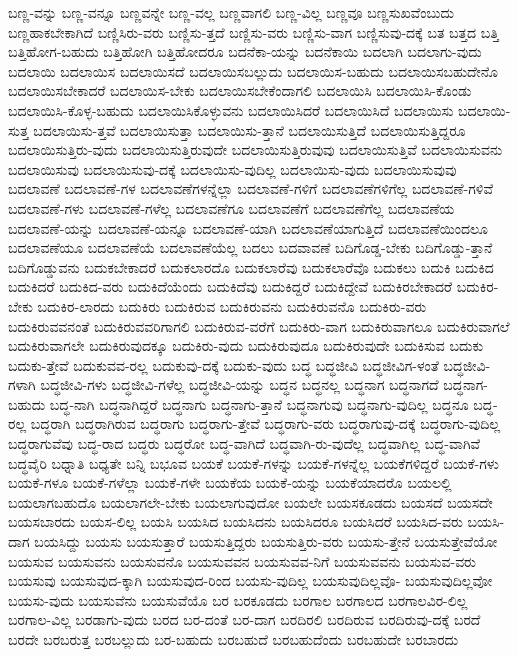 {ಬಣ್ಣ-ವನ್ನು
ಬಣ್ಣ-ವನ್ನೂ
ಬಣ್ಣವನ್ನೇ
ಬಣ್ಣ-ವಲ್ಲ
ಬಣ್ಣವಾಗಲಿ
ಬಣ್ಣ-ವಿಲ್ಲ
ಬಣ್ಣವೂ
ಬಣ್ಣಸುಖವೆಂಬುದು
ಬಣ್ಣಹಾಕಬೇಕಾಗಿದೆ
ಬಣ್ಣಿಸಿರು-ವರು
ಬಣ್ಣಿಸು-ತ್ತದೆ
ಬಣ್ಣಿಸು-ವರು
ಬಣ್ಣಿಸು-ವಾಗ
ಬಣ್ಣಿಸುವು-ದಕ್ಕೆ
ಬತ
ಬತ್ತದ
ಬತ್ತಿ
ಬತ್ತಿಹೋಗ-ಬಹುದು
ಬತ್ತಿಹೋಗಿ
ಬತ್ತಿಹೋದರೂ
ಬದನೆಕಾ-ಯನ್ನು
ಬದನೆಕಾಯಿ
ಬದಲಾಗಿ
ಬದಲಾಗು-ವುದು
ಬದಲಾಯಿ
ಬದಲಾಯಿಸ
ಬದಲಾಯಿಸದೆ
ಬದಲಾಯಿಸಬಲ್ಲುದು
ಬದಲಾಯಿಸ-ಬಹುದು
ಬದಲಾಯಿಸಬಹುದೇನೊ
ಬದಲಾಯಿಸಬೇಕಾದರೆ
ಬದಲಾಯಿಸ-ಬೇಕು
ಬದಲಾಯಿಸಬೇಕೆಂದಾಗಲಿ
ಬದಲಾಯಿಸಿ
ಬದಲಾಯಿಸಿ-ಕೊಂಡು
ಬದಲಾಯಿಸಿ-ಕೊಳ್ಳ-ಬಹುದು
ಬದಲಾಯಿಸಿಕೊಳ್ಳುವನು
ಬದಲಾಯಿಸಿದರೆ
ಬದಲಾಯಿಸಿದೆ
ಬದಲಾಯಿಸು
ಬದಲಾಯಿ-ಸುತ್ತ
ಬದಲಾಯಿಸು-ತ್ತವೆ
ಬದಲಾಯಿಸುತ್ತಾ
ಬದಲಾಯಿಸು-ತ್ತಾನೆ
ಬದಲಾಯಿಸುತ್ತಿದೆ
ಬದಲಾಯಿಸುತ್ತಿದ್ದರೂ
ಬದಲಾಯಿಸುತ್ತಿರು-ವುದು
ಬದಲಾಯಿಸುತ್ತಿರುವುದೇ
ಬದಲಾಯಿಸುತ್ತಿರುವುವು
ಬದಲಾಯಿಸುತ್ತಿವೆ
ಬದಲಾಯಿಸುವನು
ಬದಲಾಯಿಸುವು
ಬದಲಾಯಿಸುವು-ದಕ್ಕೆ
ಬದಲಾಯಿಸು-ವುದಿಲ್ಲ
ಬದಲಾಯಿಸು-ವುದು
ಬದಲಾಯಿಸುವುವು
ಬದಲಾವಣೆ
ಬದಲಾವಣೆ-ಗಳ
ಬದಲಾವಣೆಗಳನ್ನೆಲ್ಲಾ
ಬದಲಾವಣೆ-ಗಳಿಗೆ
ಬದಲಾವಣೆಗಳಿಗೆಲ್ಲ
ಬದಲಾವಣೆ-ಗಳಿವೆ
ಬದಲಾವಣೆ-ಗಳು
ಬದಲಾವಣೆ-ಗಳೆಲ್ಲ
ಬದಲಾವಣೆಗೂ
ಬದಲಾವಣೆಗೆ
ಬದಲಾವಣೆಗೆಲ್ಲ
ಬದಲಾವಣೆಯ
ಬದಲಾವಣೆ-ಯನ್ನು
ಬದಲಾವಣೆ-ಯನ್ನೂ
ಬದಲಾವಣೆ-ಯಾಗಿ
ಬದಲಾವಣೆಯಾಗುತ್ತಿದೆ
ಬದಲಾವಣೆಯಿಂದಲೂ
ಬದಲಾವಣೆಯೂ
ಬದಲಾವಣೆಯೆ
ಬದಲಾವಣೆಯೆಲ್ಲ
ಬದಲು
ಬದವಾವಣೆ
ಬದಿಗೊಡ್ಡ-ಬೇಕು
ಬದಿಗೊಡ್ಡು-ತ್ತಾನೆ
ಬದಿಗೊಡ್ಡುವನು
ಬದುಕಬೇಕಾದರೆ
ಬದುಕಲಾರದೊ
ಬದುಕಲಾರೆವು
ಬದುಕಲಾರೆವೊ
ಬದುಕಲು
ಬದುಕಿ
ಬದುಕಿದ
ಬದುಕಿದರೆ
ಬದುಕಿದ-ವರು
ಬದುಕಿದೆಯೆಂದು
ಬದುಕಿದೆವು
ಬದುಕಿದ್ದರೆ
ಬದುಕಿದ್ದೇವೆ
ಬದುಕಿರಬೇಕಾದರೆ
ಬದುಕಿರ-ಬೇಕು
ಬದುಕಿರ-ಲಾರದು
ಬದುಕಿರು
ಬದುಕಿರುವ
ಬದುಕಿರುವನು
ಬದುಕಿರುವನೊ
ಬದುಕಿರು-ವರು
ಬದುಕಿರುವವನಂತೆ
ಬದುಕಿರುವವರಿಗಾಗಲಿ
ಬದುಕಿರುವ-ವರೆಗೆ
ಬದುಕಿರು-ವಾಗ
ಬದುಕಿರುವಾಗಲೂ
ಬದುಕಿರುವಾಗಲೆ
ಬದುಕಿರುವಾಗಲೇ
ಬದುಕಿರುವುದಕ್ಕೂ
ಬದುಕಿರು-ವುದು
ಬದುಕಿರುವುದೂ
ಬದುಕಿರುವುದೇ
ಬದುಕಿಸುವ
ಬದುಕು
ಬದುಕು-ತ್ತೇವೆ
ಬದುಕುವವ-ರಲ್ಲ
ಬದುಕುವು-ದಕ್ಕೆ
ಬದುಕು-ವುದು
ಬದ್ಧ
ಬದ್ಧಜೀವಿ
ಬದ್ಧಜೀವಿಗ-ಳಂತೆ
ಬದ್ಧಜೀವಿ-ಗಳಾಗಿ
ಬದ್ಧಜೀವಿ-ಗಳು
ಬದ್ಧಜೀವಿ-ಗಳೆಲ್ಲ
ಬದ್ಧಜೀವಿ-ಯನ್ನು
ಬದ್ಧನ
ಬದ್ಧನಲ್ಲ
ಬದ್ಧನಾಗ
ಬದ್ಧನಾಗದೆ
ಬದ್ಧನಾಗ-ಬಹುದು
ಬದ್ಧ-ನಾಗಿ
ಬದ್ಧನಾಗಿದ್ದರೆ
ಬದ್ಧನಾಗು
ಬದ್ಧನಾಗು-ತ್ತಾನೆ
ಬದ್ಧನಾಗುವು
ಬದ್ಧನಾಗು-ವುದಿಲ್ಲ
ಬದ್ಧನೂ
ಬದ್ಧ-ರಲ್ಲ
ಬದ್ಧರಾಗಿ
ಬದ್ಧರಾಗಿರುವ
ಬದ್ಧರಾಗು
ಬದ್ಧರಾಗು-ತ್ತೇವೆ
ಬದ್ಧರಾಗು-ವರು
ಬದ್ಧರಾಗುವು-ದಕ್ಕೆ
ಬದ್ಧರಾಗು-ವುದಿಲ್ಲ
ಬದ್ಧರಾಗುವೆವು
ಬದ್ಧ-ರಾದ
ಬದ್ಧರು
ಬದ್ಧರೋ
ಬದ್ಧ-ವಾಗಿದೆ
ಬದ್ಧವಾಗಿ-ರು-ವುದೆಲ್ಲ
ಬದ್ಧವಾಗಿಲ್ಲ
ಬದ್ಧ-ವಾಗಿವೆ
ಬದ್ಧವೈರಿ
ಬಧ್ನಾತಿ
ಬಧ್ಯತೇ
ಬನ್ನಿ
ಬಭೂವ
ಬಯಕೆ
ಬಯಕೆ-ಗಳನ್ನು
ಬಯಕೆ-ಗಳನ್ನೆಲ್ಲ
ಬಯಕೆಗಳಿದ್ದರೆ
ಬಯಕೆ-ಗಳು
ಬಯಕೆ-ಗಳೂ
ಬಯಕೆ-ಗಳೆಲ್ಲಾ
ಬಯಕೆ-ಗಳೇ
ಬಯಕೆಯ
ಬಯಕೆ-ಯನ್ನು
ಬಯಕೆಯಾದರೊ
ಬಯಲಲ್ಲಿ
ಬಯಲಾಗಬಹುದೊ
ಬಯಲಾಗಲೇ-ಬೇಕು
ಬಯಲಾಗುವುದೋ
ಬಯಲೇ
ಬಯಸಕೂಡದು
ಬಯಸದೆ
ಬಯಸದೇ
ಬಯಸಬಾರದು
ಬಯಸ-ಲಿಲ್ಲ
ಬಯಸಿ
ಬಯಸಿದ
ಬಯಸಿದನು
ಬಯಸಿದರೂ
ಬಯಸಿದರೆ
ಬಯಸಿದ-ವರು
ಬಯಸಿ-ದಾಗ
ಬಯಸಿದ್ದು
ಬಯಸು
ಬಯಸುತ್ತಾರೆ
ಬಯಸುತ್ತಿದ್ದರು
ಬಯಸುತ್ತಿರು-ವರು
ಬಯಸು-ತ್ತೇನೆ
ಬಯಸುತ್ತೇವೆಯೋ
ಬಯಸುವ
ಬಯಸುವನು
ಬಯಸುವನೊ
ಬಯಸುವವನ
ಬಯಸುವವ-ನಿಗೆ
ಬಯಸುವವನು
ಬಯಸುವ-ವರು
ಬಯಸುವು
ಬಯಸುವುದ-ಕ್ಕಾಗಿ
ಬಯಸುವುದ-ರಿಂದ
ಬಯಸು-ವುದಿಲ್ಲ
ಬಯಸುವುದಿಲ್ಲವೊ-
ಬಯಸುವುದಿಲ್ಲವೋ
ಬಯಸು-ವುದು
ಬಯಸುವೆನು
ಬಯಸುವೆಯೊ
ಬರ
ಬರಕೂಡದು
ಬರಗಾಲ
ಬರಗಾಲದ
ಬರಗಾಲವಿರ-ಲಿಲ್ಲ
ಬರಗಾಲ-ವಿಲ್ಲ
ಬರಡಾಗು-ವುದು
ಬರದ
ಬರ-ದಂತೆ
ಬರ-ದಾಗ
ಬರದಿರಲಿ
ಬರದಿರುವ
ಬರದಿರುವು-ದಕ್ಕೆ
ಬರದೆ
ಬರದೇ
ಬರಬರುತ್ತ
ಬರಬಲ್ಲುದು
ಬರ-ಬಹುದು
ಬರಬಹುದೆ
ಬರಬಹುದೆಂದು
ಬರಬಹುದೇ
ಬರಬಾರದು
}
